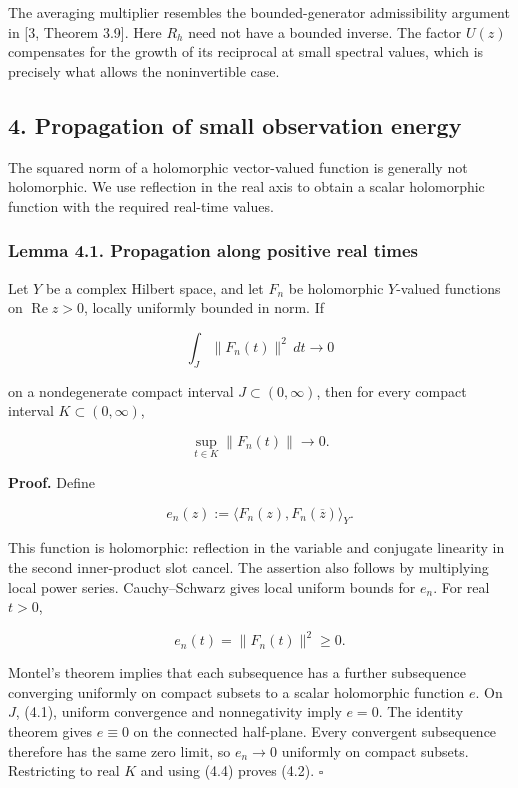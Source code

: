 \documentclass[
  11pt,
]{article}
\begin{document}
The averaging multiplier resembles the bounded-generator admissibility
argument in {[}3, Theorem 3.9{]}. Here \(R_h\) need not have a bounded
inverse. The factor \(U(z)\) compensates for the growth of its
reciprocal at small spectral values, which is precisely what allows the
noninvertible case.

\subsection{4. Propagation of small observation
energy}\label{propagation-of-small-observation-energy}

The squared norm of a holomorphic vector-valued function is generally
not holomorphic. We use reflection in the real axis to obtain a scalar
holomorphic function with the required real-time values.

\subsubsection{Lemma 4.1. Propagation along positive real
times}\label{lemma-4.1.-propagation-along-positive-real-times}

Let \(Y\) be a complex Hilbert space, and let \(F_n\) be holomorphic
\(Y\)-valued functions on \(\operatorname{Re}z>0\), locally uniformly
bounded in norm. If

\[
\int_J\|F_n(t)\|^2\,dt\longrightarrow0           \tag{4.1}
\]

on a nondegenerate compact interval \(J\subset(0,\infty)\), then for
every compact interval \(K\subset(0,\infty)\),

\[
\sup_{t\in K}\|F_n(t)\|\longrightarrow0.         \tag{4.2}
\]

\textbf{Proof.} Define

\[
e_n(z):=\langle F_n(z),F_n(\overline z)\rangle_Y. \tag{4.3}
\]

This function is holomorphic: reflection in the variable and conjugate
linearity in the second inner-product slot cancel. The assertion also
follows by multiplying local power series. Cauchy--Schwarz gives local
uniform bounds for \(e_n\). For real \(t>0\),

\[
e_n(t)=\|F_n(t)\|^2\geq0.                       \tag{4.4}
\]

Montel's theorem implies that each subsequence has a further subsequence
converging uniformly on compact subsets to a scalar holomorphic function
\(e\). On \(J\), (4.1), uniform convergence and nonnegativity imply
\(e=0\). The identity theorem gives \(e\equiv0\) on the connected
half-plane. Every convergent subsequence therefore has the same zero
limit, so \(e_n\to0\) uniformly on compact subsets. Restricting to real
\(K\) and using (4.4) proves (4.2). \(\square\)
\end{document}
